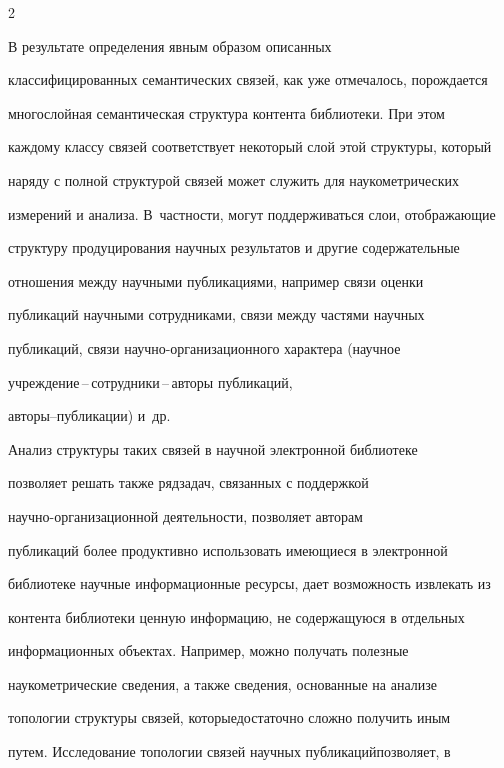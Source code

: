 \begin{multicols}{2}
     


     В результате определения явным образом описанных 


классифицированных семантических связей, как уже отмечалось, порождается 


многослойная семантическая структура контента библиотеки. При этом 


каждому классу связей соответствует некоторый слой этой структуры, который 


наряду с полной структурой связей может служить для наукометрических 


измерений и анализа. В~частности, могут поддерживаться слои, отображающие 


структуру продуцирования научных результатов и другие содержательные 


отношения между научными пуб\-ли\-ка\-ци\-ями, например связи оценки 


пуб\-ли\-ка\-ций научными сотрудниками, связи между час\-тя\-ми научных 


пуб\-ли\-ка\-ций, связи на\-уч\-но-ор\-га\-ни\-за\-ци\-он\-но\-го характера (научное 


     учреж\-де\-ние\,--\,со\-труд\-ни\-ки\,--\,ав\-то\-ры пуб\-ли\-ка\-ций, 


     ав\-то\-ры--пуб\-ли\-ка\-ции) и~др. 


     


     Анализ структуры таких связей в научной электронной библиотеке 


позволяет решать также ряд\linebreak задач, связанных с поддержкой 


     на\-уч\-но-ор\-га\-ни\-за\-ци\-он\-ной деятельности, позволяет авторам 


публикаций более продуктивно использовать име\-ющиеся в электронной 


библиотеке научные информационные ресурсы, дает возможность извлекать из 


контента библиотеки ценную информацию, не содержащуюся в отдельных 


информационных объектах. Например, можно получать полезные 


наукометрические сведения, а также сведения, основанные на анализе 


топологии структуры связей, которые\linebreak достаточно сложно получить иным 


путем. Исследование топологии связей научных публикаций\linebreak позво\-ля\-ет, в 



\end{multicols}
